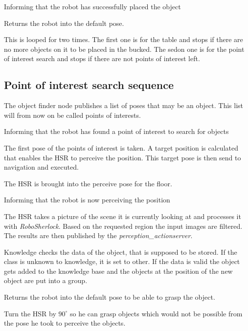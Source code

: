 \documentclass[main.tex]{subfiles}
\begin{document}
	Informing that the robot has successfully placed the object

	Returns the robot into the default pose.
	
	This is looped for two times.
	The first one is for the table and stops if there are no more objects on it to be placed in the bucked. The sedon one is for the point of interest search and stops if there are not points of interest left.
	
	\subsection{Point of interest search sequence}
	The object finder node publishes a list of poses that may be an object. This list will from now on be called points of interests.
	
    Informing that the robot has found a point of interest to search for objects
    
    The first pose of the points of interest is taken. A target position is calculated that enables the HSR to perceive the position. This target pose is then send to navigation and executed.
    
    The HSR is brought into the perceive pose for the floor.
    
    Informing that the robot is now perceiving the position
      
	The HSR takes a picture of the scene it is currently looking at and processes it with \textit{RoboSherlock}. Based on the requested region the input images are filtered. The results are then published by the \textit{perception\_actionserver}.

    
    Knowledge checks the data of the object, that is supposed to be stored. If the class is unknown to knowledge, it is set to other. If the data is valid the object gets added to the knowledge base and the objects at the position of the new object are put into a group.
    
   	Returns the robot into the default pose to be able to grasp the object.

    Turn the HSR by $90^\circ$ so he can grasp objects which would not be possible from the pose he took to perceive the objects.
\end{document}
